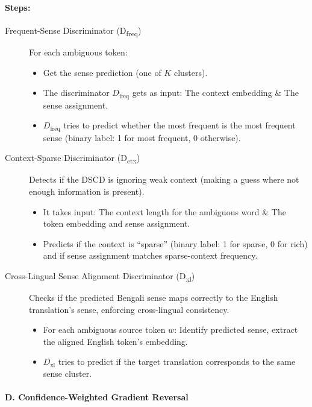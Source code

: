 \documentclass[a4paper,12pt]{article}
\begin{document}
\paragraph{Steps:}

\begin{description}
    \item[Frequent-Sense Discriminator (D\textsubscript{freq})] For each ambiguous token:
    \begin{itemize}
        \item Get the sense prediction (one of $K$ clusters).
        \item The discriminator $D_{\text{freq}}$ gets as input: The context embedding \& The sense assignment.
        \item $D_{\text{freq}}$ tries to predict whether the most frequent is the most frequent sense (binary label: 1 for most frequent, 0 otherwise).
    \end{itemize}

    \item[Context-Sparse Discriminator (D\textsubscript{ctx})] Detects if the DSCD is ignoring weak context (making a guess where not enough information is present).
    \begin{itemize}
        \item It takes input: The context length for the ambiguous word \& The token embedding and sense assignment.
        \item Predicts if the context is ``sparse'' (binary label: 1 for sparse, 0 for rich) and if sense assignment matches sparse-context frequency.
    \end{itemize}

    \item[Cross-Lingual Sense Alignment Discriminator (D\textsubscript{xl})] Checks if the predicted Bengali sense maps correctly to the English translation’s sense, enforcing cross-lingual consistency.
    \begin{itemize}
        \item For each ambiguous source token $w$: Identify predicted sense, extract the aligned English token’s embedding.
        \item $D_{\text{xl}}$ tries to predict if the target translation corresponds to the same sense cluster.
    \end{itemize}
\end{description}

\paragraph{D. Confidence-Weighted Gradient Reversal}
\end{document}
